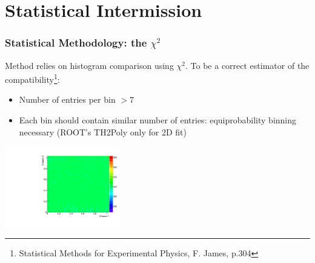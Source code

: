 \documentclass{beamer}
\begin{document}
\section{Statistical Intermission}
\begin{frame}
\frametitle{Statistical Methodology: the $\chi^2$}
Method relies on histogram comparison using $\chi^2$. To be a correct estimator
of the compatibility\footnote{Statistical Methods for 
Experimental Physics, F. James, p.304}:
\begin{itemize}
  \item Number of entries per bin $>7$
  \item Each bin should contain similar number of entries: equiprobability
  binning necessary (ROOT's TH2Poly only for 2D fit)
\end{itemize}
\begin{center}
\includegraphics[width=5cm]{Th2PolyRef.pdf}
\end{center}
\end{frame}
\end{document}
